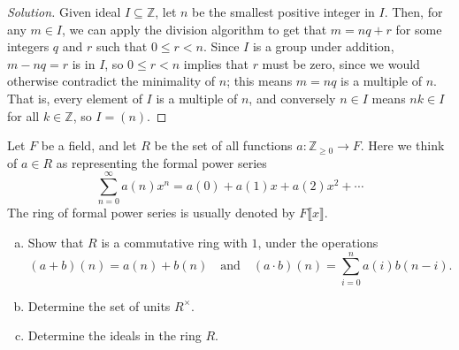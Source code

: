 \documentclass[10pt]{article}
\providecommand{\ZZ}{\mathbb Z}
\providecommand{\ii}{\item}
\newenvironment{soln}{\begin{proof}[Solution]}{\end{proof}}
\begin{document}
\begin{soln}
    Given ideal $I\subseteq\ZZ$, let $n$ be the smallest positive integer in $I$.
    Then, for any $m\in I$, we can apply the division algorithm to get that
    $m = nq + r$ for some integers $q$ and $r$ such that $0 \le r < n$.
    Since $I$ is a group under addition,
    $m - nq = r$ is in $I$, so $0\le r < n$ implies that
    $r$ must be zero, since we would otherwise contradict the minimality of $n$;
    this means $m = nq$ is a multiple of $n$.
    That is, every element of $I$ is a multiple of $n$,
    and conversely $n\in I$ means $nk\in I$ for all $k\in\ZZ$, so $I = (n)$.
\end{soln}

\begin{problem}
    Let $F$ be a field, and let $R$ be the set of all functions
    $a\colon\ZZ_{\ge0}\to F$. Here we think of $a\in R$ as representing
    the formal power series
    \begin{equation*}
	\sum_{n=0}^\infty a(n)x^n = a(0) + a(1)x + a(2)x^2 + \cdots
    \end{equation*}
    The ring of formal power series is usually denoted by $F\llbracket x\rrbracket$.
    \begin{enumerate}[(a)]
        \ii Show that $R$ is a commutative ring with $1$, under the operations
	\begin{equation*}
	    (a+b)(n) = a(n) + b(n)\quad\text{and}\quad
	    (a\cdot b)(n) = \sum_{i=0}^n a(i)b(n-i).
	\end{equation*}
	\ii Determine the set of units $R^\times$.
	\ii Determine the ideals in the ring $R$.
    \end{enumerate}
\end{problem}
\end{document}
